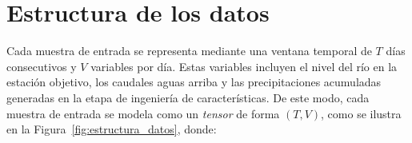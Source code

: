 \begin{table}[!t]
  \caption{Resumen de correlaciones máximas entre la estación objetivo (86218) Asunción y las variables independientes} 
  \centering

  \renewcommand{\arraystretch}{1.3} %
  \setlength{\tabcolsep}{3pt} %
  \vspace{0.5cm} 
  
  \label{tabla:correlaciones_maximas}
\end{table}








\section{Estructura de los datos}
\label{ssec:estructura_dataset}

Cada muestra de entrada se representa mediante una ventana temporal de $T$ días consecutivos y $V$ variables por día. Estas variables incluyen el nivel del río en la estación objetivo, los caudales aguas arriba y las precipitaciones acumuladas generadas en la etapa de ingeniería de características. De este modo, cada muestra de entrada se modela como un \textit{tensor} de forma $(T, V)$, como se ilustra en la Figura~\ref{fig:estructura_datos}, donde:

